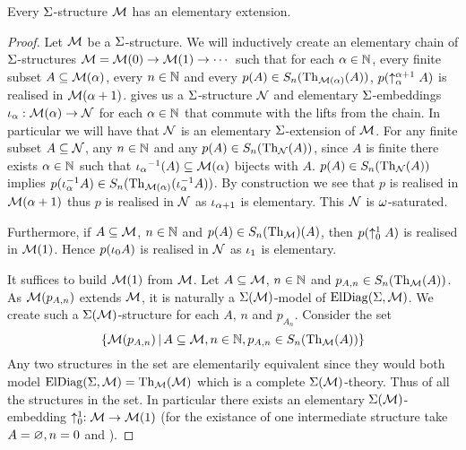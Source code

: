 \begin{prop}
    Every $\Sigma$-structure $\mathcal{M}$ has an 
     elementary extension.
\end{prop}
\begin{proof}
    Let $\mathcal{M}$ be a $\Sigma$-structure.
    We will inductively create an elementary chain of $\Sigma$-structures
    $\mathcal{M} = \mathcal{M}(0) \to \mathcal{M}(1) \to \cdots$ such that for each $\alpha \in \mathbb{N}$,
    every finite subset $A \subseteq \mathcal{M}(\alpha)$, 
    every $n \in \mathbb{N}$ and every $p(A) \in S_n(\mathrm{Th}_{\mathcal{M}(\alpha)}(A))$,
    $p(\uparrow_{\alpha}^{\alpha + 1} A)$ is realised in $\mathcal{M}(\alpha + 1)$.
    gives us a $\Sigma$-structure $\mathcal{N}$ and elementary $\Sigma$-embeddings 
    $\iota_\alpha : \mathcal{M}(\alpha) \to \mathcal{N}$ for each $\alpha \in \mathbb{N}$ that commute with 
    the lifts from the chain.
    In particular we will have that $\mathcal{N}$ is an elementary $\Sigma$-extension
    of $\mathcal{M}$.
    For any finite subset $A \subseteq \mathcal{N}$, 
    any $n \in \mathbb{N}$ and any $p(A) \in S_n(\mathrm{Th}_{\mathcal{N}}(A))$,
    since $A$ is finite there exists $\alpha \in \mathbb{N}$ such that 
    ${\iota_\alpha}^{-1}(A) \subseteq \mathcal{M}(\alpha)$ bijects with $A$.
    $p(A) \in S_n(\mathrm{Th}_{\mathcal{N}}(A))$ implies 
    $p(\iota_\alpha^{-1} A) \in S_n(\mathrm{Th}_{\mathcal{M}(\alpha)}(\iota_\alpha^{-1} A))$.
    By construction we see that
    $p$ is realised in $\mathcal{M}(\alpha + 1)$
    thus $p$ is realised in $\mathcal{N}$ as $\iota_{\alpha + 1}$ is elementary.
    This $\mathcal{N}$ is $\omega$-saturated.

    Furthermore, 
    if $A \subseteq \mathcal{M}$, $n \in \mathbb{N}$ and $p(A) \in S_n(\mathrm{Th}_{\mathcal{M}})(A)$,
    then $p(\uparrow_{0}^{1} A)$ is realised in $\mathcal{M}(1)$.
    Hence $p(\iota_0 A)$ is realised in $\mathcal{N}$ as $\iota_{1}$ is elementary.

    It suffices to build $\mathcal{M}(1)$ from $\mathcal{M}$.
    Let $A \subseteq \mathcal{M}$, $n \in \mathbb{N}$ and $p_{A,n} \in S_n(\mathrm{Th}_{\mathcal{M}} (A))$.
    As $\mathcal{M}(p_{A,n})$ extends $\mathcal{M}$, 
    it is naturally a $\Sigma(\mathcal{M})$-model of $\mathrm{ElDiag}(\Sigma,\mathcal{M})$.
    We create such a $\Sigma(\mathcal{M})$-structure for each $A$, $n$ and $p_{A_n}$.
    Consider the set 
    \[\left\{\mathcal{M}(p_{A,n}) \,|\, A \subseteq \mathcal{M}, 
    n \in \mathbb{N}, p_{A,n} \in S_n(\mathrm{Th}_{\mathcal{M}} (A))\right\}\]
    Any two structures in the set are elementarily equivalent since 
    they would both model $\mathrm{ElDiag}(\Sigma,\mathcal{M}) = \mathrm{Th}_{\mathcal{M}}(\mathcal{M})$ 
    which is a complete $\Sigma(\mathcal{M})$-theory.
    Thus 
    of all the structures in the set. 
    In particular there exists 
    an elementary $\Sigma(\mathcal{M})$-embedding $\uparrow_{0}^{1} : \mathcal{M} \to \mathcal{M}(1)$
    (for the existance of one intermediate structure take 
    $A = \varnothing, n = 0$ and ).


\end{proof}
